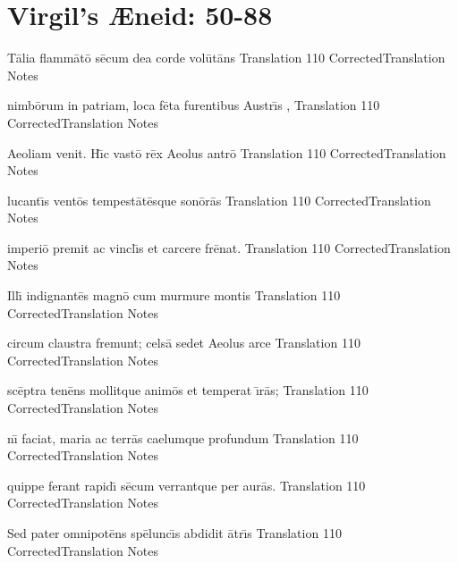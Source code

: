 \newpage
\section{Virgil's {\AE}neid:  50-88} %

\latline
  {T\={\macron a}lia flamm\={\macron a}t\={\macron o} s\={\macron e}cum dea corde vol\={\macron u}t\={\macron a}ns
}
  { Translation }
  {110}
  { CorrectedTranslation }
  { Notes }


\latline
  {nimb\={\macron o}rum in patriam, loca f\={\macron e}ta furentibus Austr\={\macron \i}s
,}
  { Translation }
  {110}
  { CorrectedTranslation }
  { Notes }


\latline
  {Aeoliam venit.  H\={\macron \i}c vast\={\macron o} r\={\macron e}x Aeolus antr\={\macron o}
}
  { Translation }
  {110}
  { CorrectedTranslation }
  { Notes }


\newpage

\latline
  {lucant\={\macron \i}s vent\={\macron o}s tempest\={\macron a}t\={\macron e}sque son\={\macron o}r\={\macron a}s
}
  { Translation }
  {110}
  { CorrectedTranslation }
  { Notes }


\latline
  {imperi\={\macron o} premit ac vincl\={\macron \i}s et carcere fr\={\macron e}nat.
}
  { Translation }
  {110}
  { CorrectedTranslation }
  { Notes }


\latline
  {Ill\={\macron \i} indignant\={\macron e}s magn\={\macron o} cum murmure montis
}
  { Translation }
  {110}
  { CorrectedTranslation }
  { Notes }

\newpage
\latline
  {circum claustra fremunt; cels\={\macron a} sedet Aeolus arce
}
  { Translation }
  {110}
  { CorrectedTranslation }
  { Notes }


\latline
  {sc\={\macron e}ptra ten\={\macron e}ns mollitque anim\={\macron o}s et temperat \={\macron \i}r\={\macron a}s;
}
  { Translation }
  {110}
  { CorrectedTranslation }
  { Notes }


\latline
  {n\={\macron \i} faciat, maria ac terr\={\macron a}s caelumque profundum
}
  { Translation }
  {110}
  { CorrectedTranslation }
  { Notes }

\newpage
\latline
  {quippe ferant rapid\={\macron \i} s\={\macron e}cum verrantque per aur\={\macron a}s.
}
  { Translation }
  {110}
  { CorrectedTranslation }
  { Notes }


\latline
  {Sed pater omnipot\={\macron e}ns sp\={\macron e}lunc\={\macron \i}s abdidit \={\macron a}tr\={\macron \i}s
}
  { Translation }
  {110}
  { CorrectedTranslation }
  { Notes }


